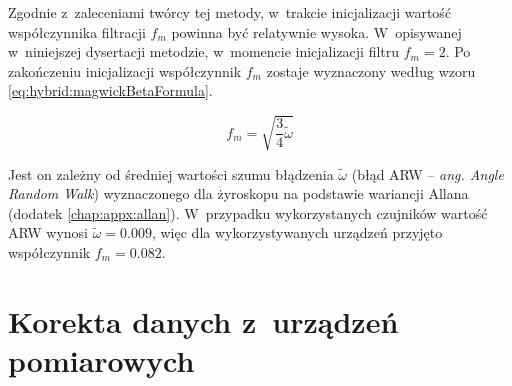 Zgodnie z~zaleceniami twórcy tej metody, w~trakcie inicjalizacji wartość współczynnika filtracji $f_m$ powinna być relatywnie wysoka. W~opisywanej w~niniejszej dysertacji metodzie, w~momencie inicjalizacji filtru $f_m = 2$. Po zakończeniu inicjalizacji współczynnik $f_m$ zostaje wyznaczony według wzoru \ref{eq:hybrid:magwickBetaFormula}.

\begin{equation}
	f_m = \sqrt{\frac{3}{4}\widetilde{\omega}}
	\label{eq:hybrid:magwickBetaFormula}
\end{equation}

Jest on zależny od średniej wartości szumu błądzenia $\widetilde{\omega}$ (błąd ARW -- \emph{ang. Angle Random Walk}) wyznaczonego dla żyroskopu na podstawie wariancji Allana (dodatek \ref{chap:appx:allan}). W~przypadku wykorzystanych czujników wartość ARW wynosi $\widetilde{\omega} = 0.009$, więc dla wykorzystywanych urządzeń przyjęto współczynnik $f_m = 0.082$.

		
\section{Korekta danych z~urządzeń pomiarowych}
		
